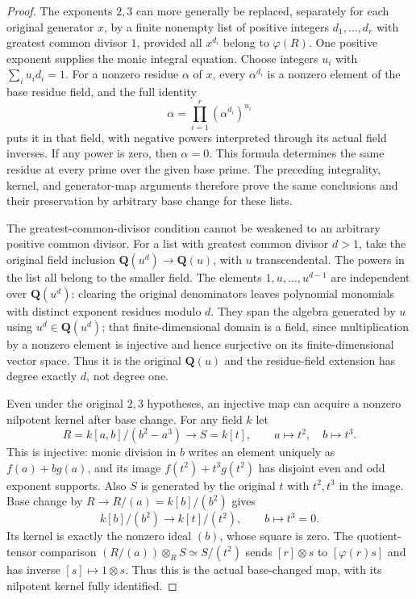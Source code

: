 \begin{proof}
The exponents $2,3$ can more generally
be replaced, separately for each original
generator $x$, by a finite nonempty list
of positive integers $d_1,\ldots,d_r$
with greatest common divisor $1$, provided
all $x^{d_i}$ belong to $\varphi(R)$.
One positive exponent supplies the monic
integral equation. Choose integers $u_i$
with $\sum_i u_i d_i=1$. For a nonzero
residue $\alpha$ of $x$, every $\alpha^{d_i}$
is a nonzero element of the base residue
field, and the full identity
$$
\alpha=\prod_{i=1}^r(\alpha^{d_i})^{u_i}
$$
puts it in that field, with negative
powers interpreted through its actual
field inverses. If any power is zero,
then $\alpha=0$. This formula determines
the same residue at every prime over
the given base prime. The preceding
integrality, kernel, and generator-map
arguments therefore prove the same
conclusions and their preservation by
arbitrary base change for these lists.

The greatest-common-divisor condition
cannot be weakened to an arbitrary
positive common divisor. For a list
with greatest common divisor $d>1$,
take the original field inclusion
$\mathbf Q(u^d)\to\mathbf Q(u)$, with
$u$ transcendental. The powers in the
list all belong to the smaller field.
The elements $1,u,\ldots,u^{d-1}$ are
independent over $\mathbf Q(u^d)$:
clearing the original denominators
leaves polynomial monomials with
distinct exponent residues modulo $d$.
They span the algebra generated by $u$
using $u^d\in\mathbf Q(u^d)$; that
finite-dimensional domain is a field,
since multiplication by a nonzero
element is injective and hence
surjective on its finite-dimensional
vector space. Thus it is the original
$\mathbf Q(u)$ and the residue-field
extension has degree exactly $d$,
not degree one.

Even under the original $2,3$ hypotheses,
an injective map can acquire a nonzero
nilpotent kernel after base change.
For any field $k$ let
$$
R=k[a,b]/(b^2-a^3)\longrightarrow S=k[t],
\qquad a\longmapsto t^2,\quad b\longmapsto t^3.
$$
This is injective: monic division in
$b$ writes an element uniquely as
$f(a)+b g(a)$, and its image
$f(t^2)+t^3g(t^2)$ has disjoint even
and odd exponent supports. Also $S$
is generated by the original $t$ with
$t^2,t^3$ in the image. Base change
by $R\to R/(a)=k[b]/(b^2)$ gives
$$
k[b]/(b^2)\longrightarrow k[t]/(t^2),
\qquad b\longmapsto t^3=0.
$$
Its kernel is exactly the nonzero
ideal $(b)$, whose square is zero.
The quotient-tensor comparison
$(R/(a))\otimes_R S\simeq S/(t^2)$
sends $[r]\otimes s$ to $[\varphi(r)s]$
and has inverse $[s]\mapsto1\otimes s$.
Thus this is the actual base-changed
map, with its nilpotent kernel fully
identified.
\end{proof}


